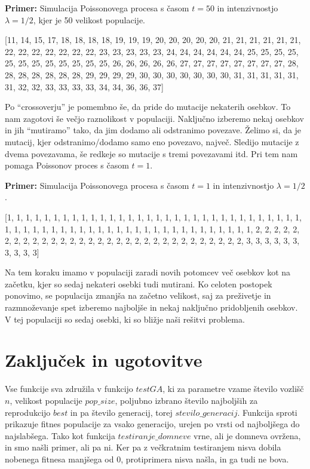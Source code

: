 \documentclass[11pt, a4paper]{article}
\begin{document}
\noindent \textbf{Primer:} Simulacija Poissonovega procesa s časom $t = 50$ in intenzivnostjo $ \lambda = 1/2 $, kjer je 50 velikost populacije.

\begin{center}
 [11, 14, 15, 17, 18, 18, 18, 18, 19, 19, 19, 20, 20, 20, 20, 20, 21, 21, 21, 21, 21, 21, 22, 22, 22, 22, 22, 22, 22, 23, 23, 23, 23, 23, 24, 24, 24, 24, 24, 24, 25, 25, 25, 25, 25, 25, 25, 25, 25, 25, 25, 25, 26, 26, 26, 26, 26, 27, 27, 27, 27, 27, 27, 27, 27, 28, 28, 28, 28, 28, 28, 28, 29, 29, 29, 29, 30, 30, 30, 30, 30, 30, 30, 31, 31, 31, 31, 31, 31, 32, 32, 33, 33, 33, 33, 34, 34, 36, 36, 37]
\end{center}

\noindent Po “crossoverju” je pomembno še, da pride do mutacije nekaterih osebkov. To nam zagotovi še večjo raznolikost v populaciji. Naključno izberemo nekaj osebkov in jih “mutiramo” tako, da jim dodamo ali odstranimo povezave. Želimo si, da je mutacij, kjer odstranimo/dodamo samo eno povezavo, največ. Sledijo mutacije z dvema povezavama, še redkeje so mutacije s tremi povezavami itd. Pri tem nam pomaga Poissonov proces s časom $t = 1$.
\newline

\noindent \textbf{Primer:} Simulacija Poissonovega procesa s časom $ t = 1 $ in intenzivnostjo $ \lambda = 1/2 $.

\begin{center}
[1, 1, 1, 1, 1, 1, 1, 1, 1, 1, 1, 1, 1, 1, 1, 1, 1, 1, 1, 1, 1, 1, 1, 1, 1, 1, 1, 1, 1, 1, 1, 1, 1, 1, 1, 1, 1, 1, 1, 1, 1, 1, 1, 1, 1, 1, 1, 1, 1, 1, 1, 1, 1, 1, 1, 1, 1, 1, 1, 2, 2, 2, 2, 2, 2, 2, 2, 2, 2, 2, 2, 2, 2, 2, 2, 2, 2, 2, 2, 2, 2, 2, 2, 2, 2, 2, 2, 2, 2, 2, 3, 3, 3, 3, 3, 3, 3, 3, 3, 3]
\end{center}

\noindent Na tem koraku imamo v populaciji zaradi novih potomcev več osebkov kot na začetku, kjer so sedaj nekateri osebki tudi mutirani.
Ko celoten postopek ponovimo, se populacija zmanjša na začetno velikost, saj za preživetje in razmnoževanje spet izberemo najboljše in nekaj naključno pridobljenih osebkov. V tej populaciji so sedaj osebki, ki so bližje naši rešitvi problema. 

\section{\textbf{Zaključek in ugotovitve}}
\noindent Vse funkcije sva združila v funkcijo $testGA$, ki za parametre vzame število vozlišč $n$, velikost populacije $pop\_size$, poljubno izbrano število najboljših za reprodukcijo $best$ in pa število generacij, torej $stevilo\_generacij$. Funkcija sproti prikazuje fitnes populacije za vsako generacijo, urejen po vrsti od najboljšega do najslabšega. Tako kot funkcija $testiranje\_domneve$ vrne, ali je domneva ovržena, in smo našli primer, ali pa ni. Ker pa z večkratnim testiranjem nisva dobila nobenega fitnesa manjšega od 0, protiprimera nisva našla, in ga tudi ne bova.
\end{document}
